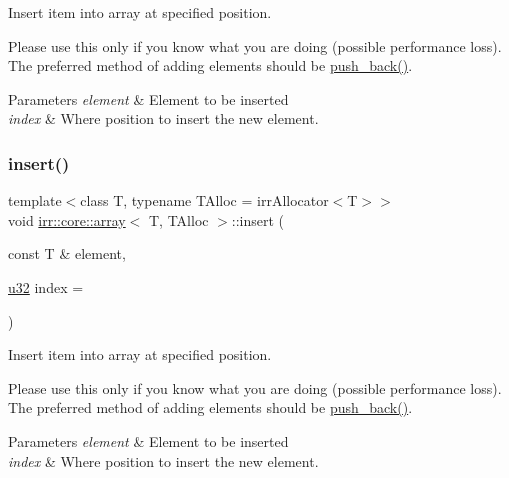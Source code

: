 Insert item into array at specified position. 

Please use this only if you know what you are doing (possible performance loss). The preferred method of adding elements should be \hyperlink{classirr_1_1core_1_1array_ad2c9dff8592b95c25c59f5383fc633fe}{push\+\_\+back()}. 
\begin{DoxyParams}{Parameters}
{\em element} & Element to be inserted \\
\hline
{\em index} & Where position to insert the new element. \\
\hline
\end{DoxyParams}
\mbox{\label{classirr_1_1core_1_1array_a3b0f73c95dd449a4de576c6b1943566c}} 
\subsubsection{\texorpdfstring{insert()}{insert()}\hspace{0.1cm}{\footnotesize\ttfamily [2/2]}}
{\footnotesize\ttfamily template$<$class T, typename T\+Alloc = irr\+Allocator$<$\+T$>$$>$ \\
void \hyperlink{classirr_1_1core_1_1array}{irr\+::core\+::array}$<$ T, T\+Alloc $>$\+::insert (\begin{DoxyParamCaption}\item[{const T \&}]{element,  }\item[{\hyperlink{namespaceirr_a0416a53257075833e7002efd0a18e804}{u32}}]{index = {} }\end{DoxyParamCaption})\hspace{0.3cm}{\ttfamily [inline]}}



Insert item into array at specified position. 

Please use this only if you know what you are doing (possible performance loss). The preferred method of adding elements should be \hyperlink{classirr_1_1core_1_1array_ad2c9dff8592b95c25c59f5383fc633fe}{push\+\_\+back()}. 
\begin{DoxyParams}{Parameters}
{\em element} & Element to be inserted \\
\hline
{\em index} & Where position to insert the new element. \\
\hline
\end{DoxyParams}
\mbox{\label{classirr_1_1core_1_1array_aef6726fc4de8ca5a01881e09664981ad}} 

